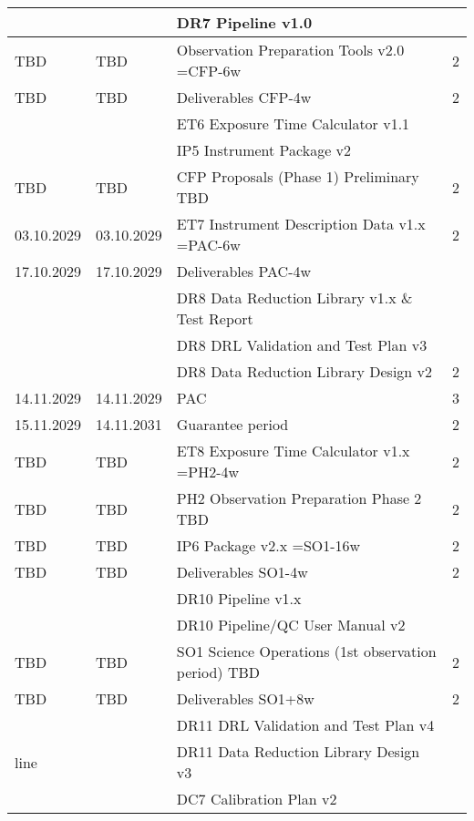 \begin{table}
\begin{tabularx}{\textwidth}{llll}
   &		    & DR7 Pipeline v1.0					    &	\\
\hline
TBD    & TBD   & Observation Preparation Tools v2.0  =CFP-6w     	    &	2 \\
\hline
TBD	   & TBD   & Deliverables CFP-4w                                         &	2 \\
   &           & ET6 Exposure Time Calculator v1.1			    &	\\
   &		    & IP5 Instrument Package v2				        &	\\
\hline
TBD	   & TBD   & CFP Proposals (Phase 1) Preliminary  TBD		    &	2 \\
\hline
03.10.2029 & 03.10.2029 & ET7 Instrument Description Data v1.x =PAC-6w	   &	2 \\
\hline
17.10.2029 & 17.10.2029 & Deliverables PAC-4w                              &	\\
   &           & DR8 Data Reduction Library v1.x \& Test Report            &	\\
   &           & DR8 DRL Validation and Test Plan v3                       &	\\
   &           & DR8 Data Reduction Library Design v2			     &   2 \\
\hline
14.11.2029 & 14.11.2029 & PAC							            &	3 \\
\hline
15.11.2029 & 14.11.2031 & Guarantee period 					        &	2 \\
\hline
TBD    & TBD   & ET8 Exposure Time Calculator v1.x =PH2-4w		    &	2 \\
\hline
TBD    & TBD   & PH2 Observation Preparation Phase 2 TBD		    &	2 \\
\hline
TBD    & TBD   & IP6 Package v2.x =SO1-16w				    &	2 \\
\hline
TBD    & TBD   & Deliverables SO1-4w                                &	2 \\
   &           & DR10 Pipeline v1.x					    &	\\
   &		    & DR10 Pipeline/QC User Manual v2				    &	\\
\hline
TBD        &	TBD        &	SO1 Science Operations (1st observation period) TBD	    &	2 \\
\hline
TBD        &	TBD        &	Deliverables SO1+8w                                         &	2 \\
	   &		   &	DR11 DRL Validation and Test Plan v4			    &	\\
line	   &		   &	DR11 Data Reduction Library Design v3			    &	\\
	   &		   &	DC7 Calibration Plan v2					    &	\\

\end{tabularx}
\end{table}
